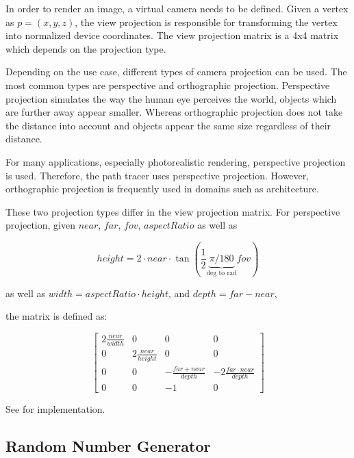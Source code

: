 In order to render an image, a virtual camera needs to be defined. Given a vertex as $p = (x, y, z)$, the view projection is responsible for transforming the vertex into normalized device coordinates. The view projection matrix is a 4x4 matrix which depends on the projection type.

Depending on the use case, different types of camera projection can be used. The most common types are perspective and orthographic projection. Perspective projection simulates the way the human eye perceives the world, objects which are further away appear smaller. Whereas orthographic projection does not take the distance into account and objects appear the same size regardless of their distance.

For many applications, especially photorealistic rendering, perspective projection is used. Therefore, the path tracer uses perspective projection. However, orthographic projection is frequently used in domains such as architecture.

These two projection types differ in the view projection matrix. For perspective projection, given $near$, $far$, $fov$, $aspectRatio$ as well as 

\begin{equation}
    \label{eqn:perspectiveProjectionHeight}
    height = 2 \cdot \mathit{near} \cdot \tan(\frac{1}{2} \underbrace{\pi / 180}_{\text{deg to rad}} \mathit{fov})
\end{equation}

as well as $width = aspectRatio \cdot height$, and $depth = far - \mathit{near}$,

the matrix is defined as:

\begin{equation}
\begin{bmatrix}
    2\frac{\mathit{near}}{width} & 0 & 0 & 0 \\
    0 & 2\frac{\mathit{near}}{height} & 0 & 0 \\
    0 & 0 & - \frac{far + \mathit{near}}{depth} & -2 \frac{far \cdot \mathit{near}}{depth} \\
    0 & 0 & -1 & 0
\end{bmatrix}
\end{equation}

See  for implementation.

\subsection{Random Number Generator}

